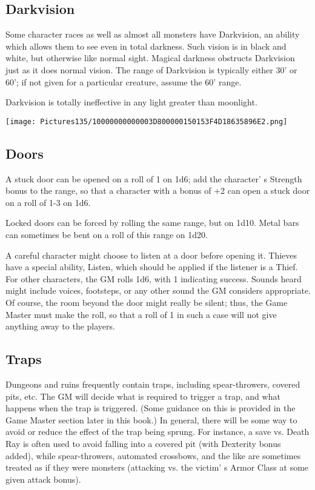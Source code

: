 \documentclass[a4paper,twoside,openany,10pt]{book}
\begin{document}
\begin{multicols}{2}
\subsection{Darkvision}\label{darkvision}

Some character races as well as almost all monsters have Darkvision, an ability which allows them to see even in total darkness. Such vision is in black and white, but otherwise like normal sight. Magical darkness obstructs Darkvision just as it does normal vision. The range of Darkvision is typically either 30' or 60'; if not given for a particular creature, assume the 60' range.

Darkvision is totally ineffective in any light greater than moonlight.


\begin{flushleft}
	\texttt{[image: Pictures135/10000000000003D800000150153F4D18635896E2.png]}
\end{flushleft}

\subsection{Doors}\label{doors}

A stuck door can be opened on a roll of 1 on 1d6; add the character' s Strength bonus to the range, so that a character with a bonus of +2 can open a stuck door on a roll of 1-3 on 1d6.

Locked doors can be forced by rolling the same range, but on 1d10. Metal bars can sometimes be bent on a roll of this range on 1d20.

A careful character might choose to listen at a door before opening it. Thieves have a special ability, Listen, which should be applied if the listener is a Thief. For other characters, the GM rolls 1d6, with 1 indicating success. Sounds heard might include voices, footsteps, or any other sound the GM considers appropriate. Of course, the room beyond the door might really be silent; thus, the Game Master must make the roll, so that a roll of 1 in such a case will not give anything away to the players.

\subsection{Traps}\label{traps}

Dungeons and ruins frequently contain traps, including spear-throwers, covered pits, etc. The GM will decide what is required to trigger a trap, and what happens when the trap is triggered. (Some guidance on this is provided in the Game Master section later in this book.) In general, there will be some way to avoid or reduce the effect of the trap being sprung. For instance, a save vs. Death Ray is often used to avoid falling into a covered pit (with Dexterity bonus added), while spear-throwers, automated crossbows, and the like are sometimes treated as if they were monsters (attacking vs. the victim' s Armor Class at some given attack bonus).


\end{multicols}
\end{document}
